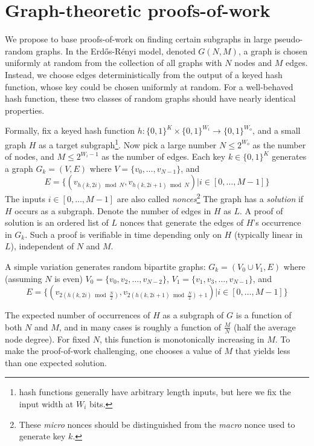 \documentclass[11pt, oneside]{article}
\begin{document}
\section{Graph-theoretic proofs-of-work}
We propose to base proofs-of-work on finding certain subgraphs in large pseudo-random graphs.
In the Erd\H{o}s-R\'{e}nyi model, denoted $G(N,M)$, a graph is chosen uniformly at random
from the collection of all graphs with $N$ nodes and $M$ edges. Instead, we choose edges
deterministically from the output of a keyed hash function, whose key could be chosen
uniformly at random. For a well-behaved hash function, these two classes of random graphs
should have nearly identical properties.

Formally, fix a keyed hash function
$h: \{0,1\}^K \times \{0,1\}^{W_i} \rightarrow \{0,1\}^{W_o}$,
and a small graph $H$ as a target subgraph\footnote{hash functions generally have arbitrary length inputs,
but here we fix the input width at $W_i$ bits.}.
Now pick a large number $N \leq 2^{W_o}$ as the number of nodes,
and $M \leq 2^{W_i-1}$ as the number of edges.
Each key $k \in \{0,1\}^K$ generates a graph $G_k = (V,E)$ where $V=\{v_0,\ldots,v_{N-1}\}$, and
\begin{equation}
E=\{(v_{h(k,2i) \bmod N},v_{h(k,2i+1) \bmod N}) | i \in [0,\ldots,M-1]\}
\end{equation}
The inputs $i \in [0,\ldots,M-1]$ are also called {\em nonces}\footnote{These
{\em micro} nonces should be distinguished from the {\em macro} nonce used to generate key $k$.}
The graph has a {\em solution} if $H$ occurs as a subgraph.
Denote the number of edges in $H$ as $L$.
A proof of solution is an ordered list of $L$ nonces that generate the edges
of $H$'s occurrence in $G_k$.
Such a proof is verifiable in time depending only on $H$ (typically linear in $L$), independent of $N$ and $M$.

A simple variation generates random bipartite graphs: $G_k = (V_0 \cup V_1,E)$ where (assuming $N$ is even)
$V_0=\{v_0,v_2,\ldots,v_{N-2}\}$, $V_1=\{v_1,v_3,\ldots,v_{N-1}\}$, and
\begin{equation}
\label{hash_edges}
E=\{(v_{2(h(k,2i) \bmod \frac{N}{2})}, v_{2(h(k,2i+1) \bmod \frac{N}{2})+1}) | i \in [0,\ldots,M-1]\}
\end{equation}

The expected number of occurrences of $H$ as a subgraph of $G$ is a function of both $N$ and $M$,
and in many cases is roughly a function of $\frac{M}{N}$ (half the average node degree).
For fixed $N$, this function is monotonically increasing in $M$.
To make the proof-of-work challenging, one chooses a value of $M$ that yields less than one
expected solution.
\end{document}
